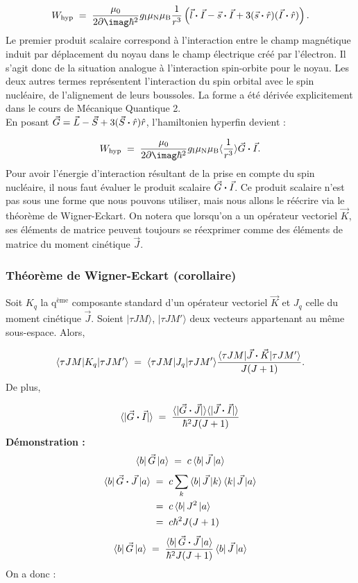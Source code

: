 \begin{equation}
    W_\text{hyp} \eq  \dfrac{\mu_0}{2\p\imag\hbar^2}g_\text{I}\mu_\text{N}\mu_\text{B}\dfrac{1}{r^3}\left( \vec{l}\Cdot\vec{I}-\vec{s}\Cdot\vec{I} + 3(\vec{s}\Cdot\hat{r})(\vec{I}\Cdot\hat{r}) \right).
\end{equation}
Le premier produit scalaire correspond à l'interaction entre le champ magnétique induit par déplacement du noyau dans le champ électrique créé par l'électron. Il s'agit donc de la situation analogue à l'interaction spin-orbite pour le noyau. Les deux autres termes représentent l'interaction du spin orbital avec le spin nucléaire, de l'alignement de leurs boussoles. La forme a été dérivée explicitement dans le cours de Mécanique Quantique 2.\\
En posant $\vec{G} = \vec{L} - \vec{S} + 3(\vec{S}\boldsymbol{\cdot}\hat{r}) \hat{r}$, l'hamiltonien hyperfin devient :

\begin{equation}
    W_\text{hyp} \eq  \dfrac{\mu_0}{2\p\imag\hbar^2}g_\text{I}\mu_\text{N}\mu_\text{B}\langle\dfrac{1}{r^3}\rangle \vec{G}\Cdot\vec{I}.
\end{equation}
Pour avoir l’énergie d’interaction résultant de la prise en compte du spin nucléaire, il nous faut évaluer le produit scalaire $\vec{G} \boldsymbol{\cdot} \vec{I}$. Ce produit scalaire n’est pas sous une forme que nous pouvons utiliser, mais nous allons le réécrire via le théorème de Wigner-Eckart. On notera que lorsqu’on a un opérateur vectoriel $\vec{K}$, ses éléments de matrice peuvent toujours se réexprimer comme des éléments de matrice du moment cinétique $\vec{J}$.



\subsubsection{Théorème de Wigner-Eckart (corollaire)}

Soit $K_q$ la q$^\text{ème}$ composante standard d'un opérateur vectoriel $\vec{K}$ et $J_q$ celle du moment cinétique $\vec{J}$. Soient $|\tau JM\rangle$, $|\tau JM'\rangle$ deux vecteurs appartenant au même sous-espace. Alors,

\[
    \langle\tau JM|K_q|\tau JM'\rangle \; = \;   \langle\tau JM|J_q|\tau JM'\rangle\dfrac{ \langle\tau JM|\vec{J}\boldsymbol{\cdot}\vec{K}|\tau JM'\rangle}{J(J+1)}.
\]
De plus,

\[
    \langle |\vec{G}\boldsymbol{\cdot}\vec{I}| \rangle \; = \;  \dfrac{\langle |\vec{G}\boldsymbol{\cdot}\vec{J}| \rangle\langle |\vec{J}\boldsymbol{\cdot}\vec{I}| \rangle}{\hbar^2J(J+1)}
\]
\textbf{Démonstration :}
\[
    \bra{b}\vec{G}\ket{a}
    \; = \; c\bra{b}\vec{J}\ket{a}
\]
\begin{align*}
    \bra{b}\vec{G} \boldsymbol{\cdot} \vec{J}\ket{a}
    &\; = \;  c\sum_k \bra{b}\vec{J}\ket{k}\bra{k}\vec{J}\ket{a}\\
    &\; = \;  c\bra{b}J^2\ket{a}\\
    &\; = \;  c\hbar^2 J(J+1)
\end{align*}
\[
    \bra{b}\vec{G}\ket{a} \; = \; \dfrac{\bra{b}\vec{G} \boldsymbol{\cdot} \vec{J}\ket{a}}{\hbar^2 J(J+1)}\bra{b}\vec{J}\ket{a}
\]
On a donc :

